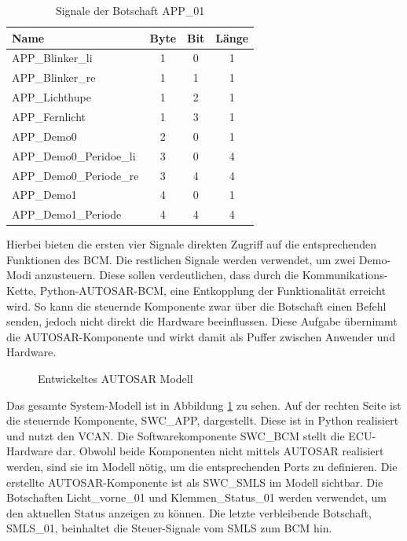 \documentclass[
  a4paper,					    %
  twoside,
  DIV=calc,     				%
  bibliography=totoc,
  cleardoublepage=empty,
  ngerman,     					%
  final       					%
]{scrbook}
\begin{document}
\begin{table}[ht]
    \centering
    \begin{tabular}[h]{l c c c}
        Name & Byte & Bit & Länge\\
        \toprule
        APP\_Blinker\_li        & 1 &  0  & 1\\
        APP\_Blinker\_re        & 1 &  1  & 1\\
        APP\_Lichthupe          & 1 &  2  & 1\\
        APP\_Fernlicht          & 1 &  3  & 1\\
        APP\_Demo0              & 2 &  0  & 1\\
        APP\_Demo0\_Peridoe\_li & 3 &  0  & 4\\
        APP\_Demo0\_Periode\_re & 3 &  4  & 4\\
        APP\_Demo1              & 4 &  0  & 1\\
        APP\_Demo1\_Periode     & 4 &  4  & 4\\
        \bottomrule
    \end{tabular}
    \caption{Signale der Botschaft APP\_01}
    \label{tab:App_Botschaft}
\end{table}

Hierbei bieten die ersten vier Signale direkten Zugriff auf die entsprechenden Funktionen des BCM. Die restlichen Signale werden verwendet, um zwei Demo-Modi anzusteuern. Diese sollen verdeutlichen, dass durch die Kommunikations-Kette, Python-AUTOSAR-BCM, eine Entkopplung der Funktionalität erreicht wird. So kann die steuernde Komponente zwar über die Botschaft einen Befehl senden, jedoch nicht direkt die Hardware beeinflussen. Diese Aufgabe übernimmt die AUTOSAR-Komponente und wirkt damit als Puffer zwischen Anwender und Hardware.

\begin{figure}[tb]
    \centering
    \resizebox{\linewidth}{!}{}
    \caption{Entwickeltes AUTOSAR Modell}
    \label{fig:smls_modell}
\end{figure}

Das gesamte System-Modell ist in Abbildung \ref{fig:smls_modell} zu sehen. Auf der rechten Seite ist die steuernde Komponente, SWC\_APP, dargestellt. Diese ist in Python realisiert und nutzt den VCAN. Die Softwarekomponente SWC\_BCM stellt die ECU-Hardware dar. Obwohl beide Komponenten nicht mittels AUTOSAR realisiert werden, sind sie im Modell nötig, um die entsprechenden Ports zu definieren. Die erstellte AUTOSAR-Komponente ist als SWC\_SMLS im Modell sichtbar. Die Botschaften Licht\_vorne\_01 und Klemmen\_Status\_01 werden verwendet, um den aktuellen Status anzeigen zu können. Die letzte verbleibende Botschaft, SMLS\_01, beinhaltet die Steuer-Signale vom SMLS zum BCM hin.
\end{document}
